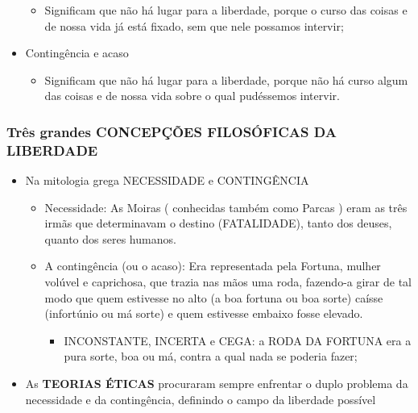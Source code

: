 \documentclass[
]{book}
\providecommand{\tightlist}{%
  \setlength{\itemsep}{0pt}\setlength{\parskip}{0pt}}
\begin{document}
\begin{itemize}
  \begin{itemize}
  \tightlist
  \item
    Significam que não há lugar para a liberdade, porque o curso das coisas e de nossa vida já está fixado, sem que nele possamos intervir;
  \end{itemize}
\item
  Contingência e acaso

  \begin{itemize}
  \tightlist
  \item
    Significam que não há lugar para a liberdade, porque não há curso algum das coisas e de nossa vida sobre o qual pudéssemos intervir.
  \end{itemize}
\end{itemize}

\hypertarget{truxeas-grandes-concepuxe7uxf5es-filosuxf3ficas-da-liberdade}{%
\subsubsection{Três grandes CONCEPÇÕES FILOSÓFICAS DA LIBERDADE}\label{truxeas-grandes-concepuxe7uxf5es-filosuxf3ficas-da-liberdade}}

\begin{itemize}
\tightlist
\item
  Na mitologia grega NECESSIDADE e CONTINGÊNCIA

  \begin{itemize}
  \tightlist
  \item
    Necessidade: As Moiras ( conhecidas também como Parcas ) eram as três irmãs que determinavam o destino (FATALIDADE), tanto dos deuses, quanto dos seres humanos.
  \item
    A contingência (ou o acaso): Era representada pela Fortuna, mulher volúvel e caprichosa, que trazia nas mãos uma roda, fazendo-a girar de tal modo que quem estivesse no alto (a boa fortuna ou boa sorte) caísse (infortúnio ou má sorte) e quem estivesse embaixo fosse elevado.

    \begin{itemize}
    \tightlist
    \item
      INCONSTANTE, INCERTA e CEGA: a RODA DA FORTUNA era a pura sorte, boa ou má, contra a qual nada se poderia fazer;
    \end{itemize}
  \end{itemize}
\item
  As \textbf{TEORIAS ÉTICAS} procuraram sempre enfrentar o duplo problema da necessidade e da contingência, definindo o campo da liberdade possível
\end{itemize}
\end{document}

